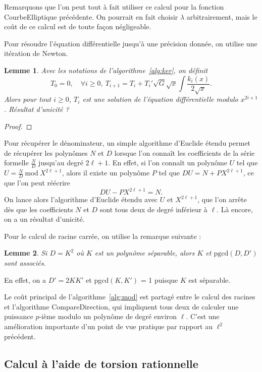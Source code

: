 \documentclass[11pt,a4paper]{article}
\renewcommand{\mod}{\ \mathrm{mod}\ }
\newtheorem*{lem}{Lemme}
\theoremstyle{definition}
\begin{document}
Remarquons que l'on peut tout à fait utiliser ce calcul pour la fonction {\sc CourbeElliptique} précédente. On pourrait en fait choisir $\lambda$ arbitrairement, mais le coût de ce calcul est de toute façon négligeable.

Pour résoudre l'équation différentielle jusqu'à une précision donnée, on utilise une itération de Newton.

\begin{lem} Avec les notations de l'algorithme~\ref{alg:ker}, on définit
$$T_0 = 0, \quad \forall i\geq 0,\ T_{i+1} = T_i + T_i' \sqrt{G} \sqrt{x} \int \frac{k_i(x)}{2\sqrt{x}}.$$
Alors pour tout $i\geq 0$, $T_i$ est une solution de l'équation différentielle modulo $x^{2i+1}$.
Résultat d'unicité ?
\end{lem}

\begin{proof}

\end{proof}

 Pour récupérer le dénominateur, un simple algorithme d'Euclide étendu permet de récupérer les polynômes $N$ et $D$ lorsque l'on connaît les coefficients de la série formelle $\frac{N}{D}$ jusqu'au degré $2\ell + 1$. En effet, si l'on connaît un polynôme $U$ tel que $U = \frac{N}{D} \mod X^{2\ell + 1}$, alors il existe un polynôme $P$ tel que $D U = N + P X^{2\ell+1}$, ce que l'on peut réécrire
 $$D U - P X^{2\ell + 1} = N.$$
On lance alors l'algorithme d'Euclide étendu avec $U$ et $X^{2\ell + 1}$, que l'on arrête dès que les coefficients $N$ et $D$ sont tous deux de degré inférieur à $\ell$. Là encore, on a un résultat d'unicité.

Pour le calcul de racine carrée, on utilise la remarque suivante :

\begin{lem}
Si $D = K^2$ où $K$ est un polynôme séparable, alors $K$ et $\mathrm{pgcd}(D, D')$ sont associés.
\end{lem}

En effet, on a $D' = 2 K K'$ et pgcd$(K, K')$ = 1 puisque $K$ est séparable.

Le coût principal de l'algorithme~\ref{alg:mod} est partagé entre le calcul des racines et l'algorithme {\sc CompareDirection}, qui impliquent tous deux de calculer une puissance $p$-ième modulo un polynôme de degré environ $\ell$. C'est une amélioration importante d'un point de vue pratique par rapport au $\ell^2$ précédent.

\subsection{Calcul à l'aide de torsion rationnelle}
\end{document}
